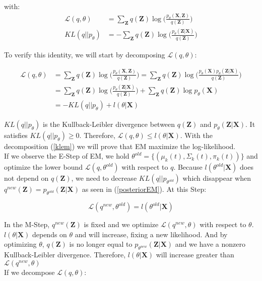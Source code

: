 \documentclass[12pt]{article}
\def\bX{\boldsymbol X}
\def\bZ{\boldsymbol Z}
\begin{document}
with:
  \begin{align}
\mathcal{L}(q,\theta)&=\sum_{\bZ}q(\bZ)\log\Big(\frac{p_{\theta}(\bX,\bZ)}{q(\bZ)}\Big)\\
KL(q||p_{\theta})&=-\sum_{\bZ}q(\bZ)\log\Big(\frac{p_{\theta}(\bZ|\bX)}{q(\bZ)}\Big)
  \end{align}

To verify this identity, we will start by decomposing $\mathcal{L}(q,\theta)$:

\begin{align}
\mathcal{L}(q,\theta)&=\sum_{\bZ}q(\bZ)\log\Big(\frac{p_{\theta}(\bX,\bZ)}{q(\bZ)}\Big)=\sum_{\bZ}q(\bZ)\log\Big(\frac{p_{\theta}(\bX)p_{\theta}(\bZ|\bX)}{q(\bZ)}\Big)\\
&=\sum_{\bZ}q(\bZ)\log\Big(\frac{p_{\theta}(\bZ|\bX)}{q(\bZ)}  \Big)  +\sum_{\bZ}q(\bZ)\log p_{\theta}(\bX)\\
&=-KL(q||p_{\theta})+l(\theta|\bX)
\end{align}

$KL(q||p_{\theta})$ is the Kullback-Leibler divergence between $q(\bZ)$ and $p_{\theta}(\bZ|\bX)$. It satisfies $KL(q||p_{\theta})\geq0$. Therefore, $\mathcal{L}(q,\theta)\leq l(\theta|\bX) $. With the decomposition (\ref{klem}) we will prove that EM maximize the log-likelihood.\\

If we observe the E-Step of EM, we hold $\theta^{old}=\{(\mu_k(t),\Sigma_k(t),\pi_k(t))\}$ and optimize the lower bound $\mathcal{L}(q,\theta^{old})$ with respect to $q$. Because $l(\theta^{old}|\bX)$ does not depend on $q(\bZ)$, we need to decrease $KL(q||p_{\theta^{old}})$ which disappear when $q^{new}(\bZ)=p_{\theta^{old}}(\bZ|\bX)$ as seen in (\ref{posteriorEM}). At this Step:

\begin{equation}
  \mathcal{L}(q^{new},\theta^{old})=l(\theta^{old}|\bX)
\end{equation}

In the M-Step, $q^{new}(\bZ)$ is fixed and we optimize $\mathcal{L}(q^{new},\theta)$ with respect to $\theta$. $l(\theta|\bX)$ depends on $\theta$ and will increase, fixing a new likelihood. And by optimizing $\theta$, $q(\bZ)$ is no longer equal to $p_{\theta^{new}}(\bZ|\bX)$ and we have a nonzero Kullback-Leibler divergence. Therefore, $l(\theta|\bX)$ will increase greater than $\mathcal{L}(q^{new},\theta)$\\

If we decompose $\mathcal{L}(q,\theta)$:
\end{document}
